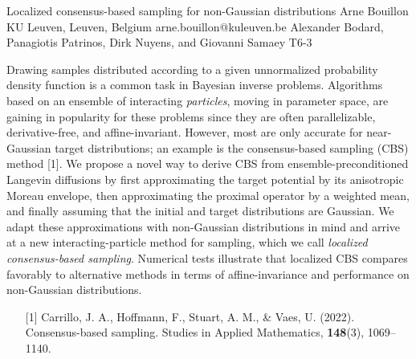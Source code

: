 \begin{talk}
  {Localized consensus-based sampling for non-Gaussian distributions}%
  {Arne Bouillon}%
  {KU Leuven, Leuven, Belgium}%
  {arne.bouillon@kuleuven.be}%
  {Alexander Bodard, Panagiotis Patrinos, Dirk Nuyens, and Giovanni Samaey}%
  {T6-3}%

  Drawing samples distributed according to a given unnormalized probability density function is a common task in Bayesian inverse problems. Algorithms based on an ensemble of interacting \emph{particles}, moving in parameter space, are gaining in popularity for these problems since they are often parallelizable, derivative-free, and affine-invariant. However, most are only accurate for near-Gaussian target distributions; an example is the consensus-based sampling (CBS) method [1]. We propose a novel way to derive CBS from ensemble-preconditioned Langevin diffusions by first approximating the target potential by its anisotropic Moreau envelope, then approximating the proximal operator by a weighted mean, and finally assuming that the initial and target distributions are Gaussian. We adapt these approximations with non-Gaussian distributions in mind and arrive at a new interacting-particle method for sampling, which we call \emph{localized consensus-based sampling}. Numerical tests illustrate that localized CBS compares favorably to alternative methods in terms of affine-invariance and performance on non-Gaussian distributions.
\medskip

\begin{enumerate}
  \item[{[1]}] Carrillo, J. A., Hoffmann, F., Stuart, A. M., \& Vaes, U. (2022). Consensus-based sampling. Studies in Applied Mathematics, \textbf{148}(3), 1069--1140.
\end{enumerate}
\end{talk}

